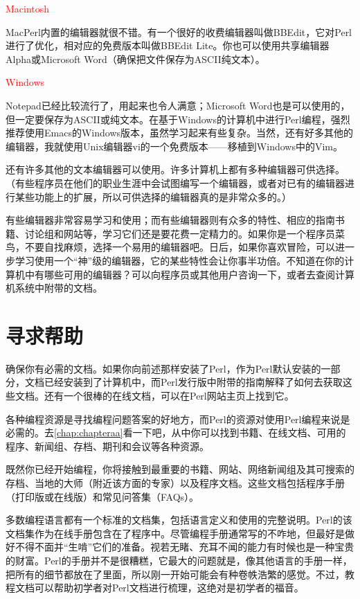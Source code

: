 \noindent
\textcolor{red}{Macintosh}
\begin{adjustwidth}{1cm}{}
MacPerl内置的编辑器就很不错。有一个很好的收费编辑器叫做BBEdit，它对Perl进行了优化，相对应的免费版本叫做BBEdit Lite。你也可以使用共享编辑器Alpha或Microsoft Word（确保把文件保存为ASCII纯文本）。
\end{adjustwidth}

\noindent
\textcolor{red}{Windows}
\begin{adjustwidth}{1cm}{}
Notepad已经比较流行了，用起来也令人满意；Microsoft Word也是可以使用的，但一定要保存为ASCII或纯文本。在基于Windows的计算机中进行Perl编程，强烈推荐使用Emacs的Windows版本，虽然学习起来有些复杂。当然，还有好多其他的编辑器，我就使用Unix编辑器vi的一个免费版本——移植到Windows中的Vim。
\end{adjustwidth}

还有许多其他的文本编辑器可以使用。许多计算机上都有多种编辑器可供选择。（有些程序员在他们的职业生涯中会试图编写一个编辑器，或者对已有的编辑器进行某些功能上的扩展，所以可供选择的编辑器真的是非常众多的。）

有些编辑器非常容易学习和使用；而有些编辑器则有众多的特性、相应的指南书籍、讨论组和网站等，学习它们还是要花费一定精力的。如果你是一个程序员菜鸟，不要自找麻烦，选择一个易用的编辑器吧。日后，如果你喜欢冒险，可以进一步学习使用一个“神”级的编辑器，它的某些特性会让你事半功倍。不知道在你的计算机中有哪些可用的编辑器？可以向程序员或其他用户咨询一下，或者去查阅计算机系统中附带的文档。

\section{寻求帮助}
确保你有必需的文档。如果你向前述那样安装了Perl，作为Perl默认安装的一部分，文档已经安装到了计算机中，而Perl发行版中附带的指南解释了如何去获取这些文档。还有一个很棒的在线文档，可以在Perl网站主页上找到它。

各种编程资源是寻找编程问题答案的好地方，而Perl的资源对使用Perl编程来说是必需的。去\autoref{chap:chapteraa}看一下吧，从中你可以找到书籍、在线文档、可用的程序、新闻组、存档、期刊和会议等各种资源。

既然你已经开始编程，你将接触到最重要的书籍、网站、网络新闻组及其可搜索的存档、当地的大师（附近该方面的专家）以及程序文档。这些文档包括程序手册（打印版或在线版）和常见问答集（FAQs）。

多数编程语言都有一个标准的文档集，包括语言定义和使用的完整说明。Perl的该文档集作为在线手册包含在了程序中。尽管编程手册通常写的不咋地，但最好是做好不得不面并“生啃”它们的准备。视若无睹、充耳不闻的能力有时候也是一种宝贵的财富。Perl的手册并不是很糟糕，它最大的问题就是，像其他语言的手册一样，把所有的细节都放在了里面，所以刚一开始可能会有种卷帙浩繁的感觉。不过，教程文档可以帮助初学者对Perl文档进行梳理，这绝对是初学者的福音。

